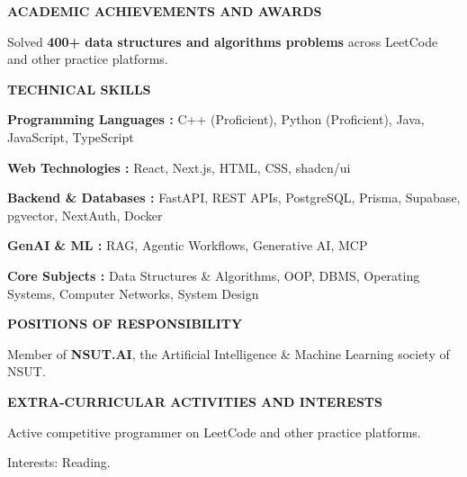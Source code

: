 \documentclass[a4paper,11pt]{article}
\newcommand{\sectionbar}[1]{%
  \vspace{4pt}%
  \noindent\colorbox{barGray}{%
    \parbox{\dimexpr\textwidth-2\fboxsep\relax}{%
      \textbf{\footnotesize\hspace{2pt}\MakeUppercase{\letterspace{#1}}}%
    }%
  }\vspace{3pt}%
}
\newcommand{\letterspace}[1]{#1}
\begin{document}
\sectionbar{Academic Achievements and Awards}
\begin{tight}
  \item Solved \textbf{400+ data structures and algorithms problems} across LeetCode and other practice platforms.
\end{tight}

\sectionbar{Technical Skills}
\begin{tight}
  \item \textbf{Programming Languages :} C++ (Proficient), Python (Proficient), Java, JavaScript, TypeScript
  \item \textbf{Web Technologies :} React, Next.js, HTML, CSS, shadcn/ui
  \item \textbf{Backend \& Databases :} FastAPI, REST APIs, PostgreSQL, Prisma, Supabase, pgvector, NextAuth, Docker
  \item \textbf{GenAI \& ML :} RAG, Agentic Workflows, Generative AI, MCP
  \item \textbf{Core Subjects :} Data Structures \& Algorithms, OOP, DBMS, Operating Systems, Computer Networks, System Design 
\end{tight}

\sectionbar{Positions of Responsibility}
\begin{tight}
  \item Member of \textbf{NSUT.AI}, the Artificial Intelligence \& Machine Learning society of NSUT.
\end{tight}

\sectionbar{Extra-Curricular Activities and Interests}
\begin{tight}
  \item Active competitive programmer on LeetCode and other practice platforms.
  \item Interests: Reading.
\end{tight}
\end{document}
